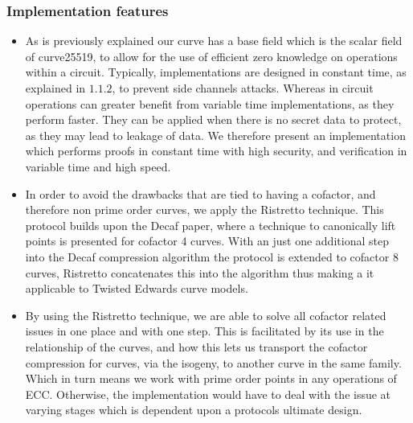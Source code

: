 \documentclass{article}
\begin{document}
\subsubsection{Implementation features}
\begin{itemize}
    \item As is previously explained our curve has a base field which is the scalar field of curve25519, to allow for the use of efficient zero knowledge on operations within a circuit. Typically, implementations are designed in constant time, as explained in $1.1.2$, to prevent side channels attacks. Whereas in circuit operations can greater benefit from variable time implementations, as they perform faster. They can be applied when there is no secret data to protect, as they may lead to leakage of data. We therefore present an implementation which performs proofs in constant time with high security, and  verification in variable time and high speed. \\ 
    \item In order to avoid the drawbacks that are tied to having a cofactor, and therefore non prime order curves, we apply the Ristretto technique. This protocol builds upon the Decaf paper, where a technique to canonically lift points is presented for cofactor 4 curves. With an just one additional step into the Decaf compression algorithm the protocol is extended to cofactor 8 curves, Ristretto concatenates this into the algorithm thus making a it applicable to Twisted Edwards curve models.\\
    \item By using the Ristretto technique, we are able to solve all cofactor related issues in one place and with one step. This is facilitated by its use in the relationship of the curves, and how this lets us transport the cofactor compression for curves, via the isogeny, to another curve in the same family. Which in turn means we work with prime order points in any operations of ECC. Otherwise, the implementation would have to deal with the issue at varying stages which is dependent upon a protocols ultimate design. \\
\end{itemize}
\end{document}

